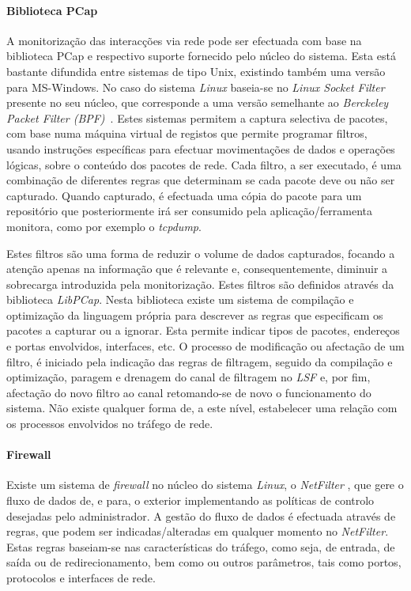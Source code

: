 \documentclass[a4paper]{llncs}
\begin{document}
\paragraph{Biblioteca PCap\\}

A monitorização das interacções via rede pode ser efectuada com base na biblioteca PCap e respectivo suporte fornecido pelo núcleo do sistema.
 Esta está bastante difundida entre sistemas de tipo Unix, existindo também uma versão para MS-Windows.
No caso do sistema \textit{Linux} baseia-se no \textit{Linux Socket Filter} presente no seu núcleo, que corresponde a uma versão semelhante ao \textit{Berckeley Packet Filter (BPF)}~\cite{Mccanne92thebsd}.
 Estes sistemas permitem a captura selectiva de pacotes, com base numa máquina virtual de registos que permite programar filtros, usando instruções específicas para efectuar movimentações de dados e operações lógicas, sobre o conteúdo dos pacotes de rede.
 Cada filtro, a ser executado, é uma combinação de diferentes regras que determinam se cada pacote deve ou não ser capturado.
 Quando capturado, é efectuada uma cópia do pacote para um repositório que posteriormente irá ser consumido pela aplicação/ferramenta monitora, como por exemplo o \textit{tcpdump}.


Estes filtros são uma forma de reduzir o volume de dados capturados, focando a atenção apenas na informação que é relevante e, consequentemente, diminuir a sobrecarga introduzida pela monitorização.
 Estes filtros são definidos através da biblioteca \textit{LibPCap}.
 Nesta biblioteca existe um sistema de compilação e optimização da linguagem própria para descrever as regras que especificam os pacotes a capturar ou a ignorar.
 Esta permite indicar tipos de pacotes, endereços e portas envolvidos, interfaces, etc.
 O processo de modificação ou afectação de um filtro, é iniciado pela indicação das regras de filtragem, seguido da compilação e optimização, paragem e drenagem do canal de filtragem no \textit{LSF} e, por fim, afectação do novo filtro ao canal retomando-se de novo o funcionamento do sistema.
 Não existe qualquer forma de, a este nível, estabelecer uma relação com os processos envolvidos no tráfego de rede.

\paragraph{Firewall\\}

Existe um sistema de \textit{firewall} no núcleo do sistema \textit{Linux}, o \textit{NetFilter} %
, que gere o fluxo de dados de, e para, o exterior implementando as políticas de controlo desejadas pelo administrador.
 A gestão do fluxo de dados é efectuada através de regras, que podem ser indicadas/alteradas em qualquer momento no \textit{NetFilter}.
 Estas regras baseiam-se nas características do tráfego, como seja, de entrada, de saída ou de redirecionamento, bem como ou outros parâmetros, tais como portos, protocolos e interfaces de rede.
\end{document}
